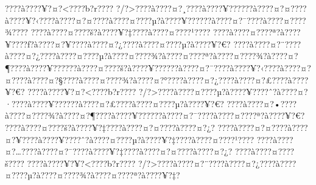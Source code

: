 \documentclass[11pt, openany]{book}
\begin{document}
???\textbar{}?à???\textbar{}?¥?¤?\textless{}???\textbar{}?b?r???\textbar{}?
?/?\textgreater{}???\textbar{}?à???\textbar{}?¤?¸???\textbar{}?à???\textbar{}?¥?????\textbar{}?à???\textbar{}?¤?¤???\textbar{}?à???\textbar{}?¥?‹???\textbar{}?à???\textbar{}?¤?¤???\textbar{}?à???\textbar{}?¤???\textbar{}?µ?à???\textbar{}?¥?????\textbar{}?à???\textbar{}?¤?¯???\textbar{}?à???\textbar{}?¤???\textbar{}?¾???\textbar{}?
???\textbar{}?à???\textbar{}?¤???\textbar{}?š?à???\textbar{}?¥?‡???\textbar{}?à???\textbar{}?¤???\textbar{}?¹???\textbar{}?
???\textbar{}?à???\textbar{}?¤???\textbar{}?ª?à???\textbar{}?¥???\textbar{}?ƒ?à???\textbar{}?¤?¥???\textbar{}?à???\textbar{}?¤?¿???\textbar{}?à???\textbar{}?¤???\textbar{}?µ?à???\textbar{}?¥?€?
???\textbar{}?à???\textbar{}?¤?¨???\textbar{}?à???\textbar{}?¤?¿???\textbar{}?à???\textbar{}?¤???\textbar{}?µ?à???\textbar{}?¤???\textbar{}?¾?à???\textbar{}?¤???\textbar{}?ª?à???\textbar{}?¤???\textbar{}?¾?à???\textbar{}?¤?¶???\textbar{}?à???\textbar{}?¥?????\textbar{}?à???\textbar{}?¤???\textbar{}?š?à???\textbar{}?¥?????\textbar{}?à???\textbar{}?¤?¯???\textbar{}?à???\textbar{}?¥?‹???\textbar{}?à???\textbar{}?¤?¤???\textbar{}?à???\textbar{}?¤?§???\textbar{}?à???\textbar{}?¤???\textbar{}?¾?à???\textbar{}?¤?°???\textbar{}?à???\textbar{}?¤?¿???\textbar{}?à???\textbar{}?¤?£???\textbar{}?à???\textbar{}?¥?€?
???\textbar{}?à???\textbar{}?¥?¤?\textless{}???\textbar{}?b?r???\textbar{}?
?/?\textgreater{}???\textbar{}?à???\textbar{}?¤???\textbar{}?µ?à???\textbar{}?¥???\textbar{}?ˆ?à???\textbar{}?¤?·???\textbar{}?à???\textbar{}?¥?????\textbar{}?à???\textbar{}?¤?£???\textbar{}?à???\textbar{}?¤???\textbar{}?µ?à???\textbar{}?¥?€?
???\textbar{}?à???\textbar{}?¤?•???\textbar{}?à???\textbar{}?¤???\textbar{}?¾?à???\textbar{}?¤?¶???\textbar{}?à???\textbar{}?¥?????\textbar{}?à???\textbar{}?¤?¯???\textbar{}?à???\textbar{}?¤???\textbar{}?ª?à???\textbar{}?¥?€?
???\textbar{}?à???\textbar{}?¤???\textbar{}?š?à???\textbar{}?¥?‡???\textbar{}?à???\textbar{}?¤?¤???\textbar{}?à???\textbar{}?¤?¿?
???\textbar{}?à???\textbar{}?¤?¤???\textbar{}?à???\textbar{}?¤?¥???\textbar{}?à???\textbar{}?¥???\textbar{}?ˆ?à???\textbar{}?¤???\textbar{}?µ?à???\textbar{}?¥?‡???\textbar{}?à???\textbar{}?¤???\textbar{}?¹???\textbar{}?
???\textbar{}?à???\textbar{}?¤?\ldots{}???\textbar{}?à???\textbar{}?¤?¯???\textbar{}?à???\textbar{}?¥?‡???\textbar{}?à???\textbar{}?¤?¤???\textbar{}?à???\textbar{}?¤?¿?
???\textbar{}?à???\textbar{}?¤???\textbar{}?š???\textbar{}?
???\textbar{}?à???\textbar{}?¥?¥?\textless{}???\textbar{}?b?r???\textbar{}?
?/?\textgreater{}???\textbar{}?à???\textbar{}?¤?¨???\textbar{}?à???\textbar{}?¤?¿???\textbar{}?à???\textbar{}?¤???\textbar{}?µ?à???\textbar{}?¤???\textbar{}?¾?à???\textbar{}?¤???\textbar{}?ª?à???\textbar{}?¥?‡?
\end{document}
